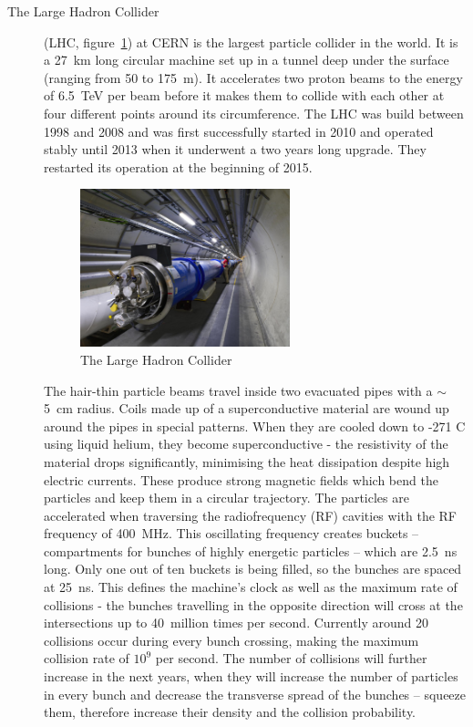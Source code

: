 \documentclass[twoside,12pt]{packages/mytustyle}  %
\begin{document}
\begin{description}
\item[The Large Hadron Collider]
(LHC, figure~\ref{fig:lhc}) at CERN is the largest particle collider in the world. It is a 27~km long circular machine set up in a tunnel deep under the surface (ranging from 50 to 175~m). It accelerates two proton beams to the energy of 6.5~TeV per beam before it makes them to collide with each other at four different points around its circumference. The LHC was build between 1998 and 2008 and was first successfully started in 2010 and operated stably until 2013 when it underwent a two years long upgrade. They restarted its operation at the beginning of 2015.
\begin{figure}[!t]
\centering
\includegraphics[width=0.6\textwidth]{pics/lhc}
\caption{The Large Hadron Collider \cite{Maximilien:1324852}}
\label{fig:lhc}
\end{figure}
The hair-thin particle beams travel inside two evacuated pipes with a $\sim$5~cm radius. Coils made up of a superconductive material are wound up around the pipes in special patterns. When they are cooled down to -271 \textdegree C using liquid helium, they become superconductive - the resistivity of the material drops significantly, minimising the heat dissipation despite high electric currents. These produce strong magnetic fields which bend the particles and keep them in a circular trajectory. The particles are accelerated when traversing the radiofrequency (RF) cavities with the RF frequency of 400~MHz. This oscillating frequency creates buckets -- compartments for bunches of highly energetic particles -- which are 2.5~ns long. Only one out of ten buckets is being filled, so the bunches are spaced at 25~ns. This defines the machine's clock as well as the maximum rate of collisions - the bunches travelling in the opposite direction will cross at the intersections up to 40~million times per second. Currently around 20 collisions occur during every bunch crossing, making the maximum collision rate of $10^9$ per second. The number of collisions will further increase in the next years, when they will increase the number of particles in every bunch and decrease the transverse spread of the bunches -- squeeze them, therefore increase their density and the collision probability.
\end{description}
\end{document}
